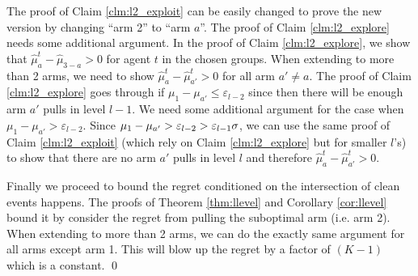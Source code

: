 The proof of Claim \ref{clm:l2_exploit} can be easily changed to prove the new version by changing ``arm 2'' to ``arm $a$''. The proof of Claim \ref{clm:l2_explore} needs some additional argument. In the proof of Claim \ref{clm:l2_explore}, we show that $\hat{\mu}_a^t - \hat{\mu}_{3-a} > 0 $ for agent $t$ in the chosen groups. When extending to more than 2 arms, we need to show $\hat{\mu}_a^t - \hat{\mu}_{a'}^t > 0$ for all arm $a' \neq a$. The proof of Claim \ref{clm:l2_explore} goes through if $\mu_1- \mu_{a'} \leq \varepsilon_{l-2}$ since then there will be enough arm $a'$ pulls in level $l-1$. We need some additional argument for the case when $\mu_1 - \mu_{a'} > \varepsilon_{l-2}$. Since $\mu_1- \mu_{a'} > \varepsilon_{l-2} > \varepsilon_{l-1}\sigma$, we can use the same proof of Claim \ref{clm:l2_exploit} (which rely on Claim \ref{clm:l2_explore} but for smaller $l$'s) to show that there are no arm $a'$ pulls in level $l$ and therefore $\hat{\mu}_a^t - \hat{\mu}_{a'}^t > 0$.

Finally we proceed to bound the regret conditioned on the intersection of clean events happens. The proofs of Theorem \ref{thm:llevel} and Corollary \ref{cor:llevel} bound it by consider the regret from pulling the suboptimal arm (i.e. arm 2). When extending to more than 2 arms, we can do the exactly same argument for all arms except arm 1. This will blow up the regret by a factor of $(K-1)$ which is a constant.
\qed



